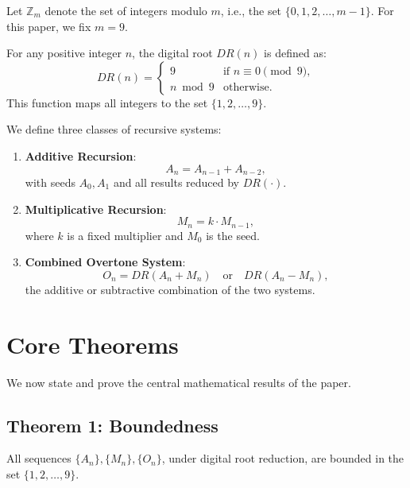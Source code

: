 \documentclass[12pt]{article}
\begin{document}
\begin{definition}
Let \( \mathbb{Z}_m \) denote the set of integers modulo \( m \), i.e., the set \( \{0, 1, 2, \dots, m-1\} \). For this paper, we fix \( m = 9 \).
\end{definition}

\begin{definition}
For any positive integer \( n \), the digital root \( DR(n) \) is defined as:
\[
DR(n) =
\begin{cases}
9 & \text{if } n \equiv 0 \pmod{9}, \\
n \bmod 9 & \text{otherwise}.
\end{cases}
\]
This function maps all integers to the set \( \{1, 2, \dots, 9\} \).
\end{definition}

\begin{definition}
We define three classes of recursive systems:
\begin{enumerate}
    \item \textbf{Additive Recursion}:
    \[
    A_n = A_{n-1} + A_{n-2},
    \]
    with seeds \( A_0, A_1 \) and all results reduced by \( DR(\cdot) \).

    \item \textbf{Multiplicative Recursion}:
    \[
    M_n = k \cdot M_{n-1},
    \]
    where \( k \) is a fixed multiplier and \( M_0 \) is the seed.

    \item \textbf{Combined Overtone System}:
    \[
    O_n = DR(A_n + M_n) \quad \text{or} \quad DR(A_n - M_n),
    \]
    the additive or subtractive combination of the two systems.
\end{enumerate}
\end{definition}

\section{Core Theorems}

We now state and prove the central mathematical results of the paper.

\subsection{Theorem 1: Boundedness}

\begin{theorem}
All sequences \( \{A_n\}, \{M_n\}, \{O_n\} \), under digital root reduction, are bounded in the set \( \{1, 2, \dots, 9\} \).
\end{theorem}
\end{document}
